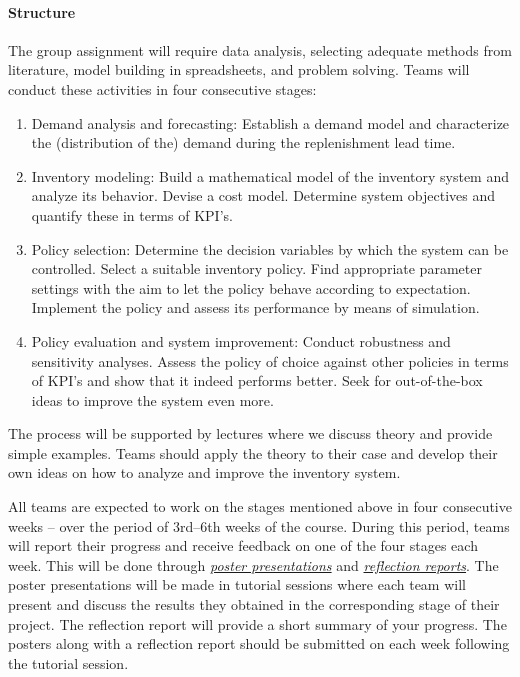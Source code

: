 \documentclass{article}
\begin{document}
\paragraph{Structure} The group assignment will require data analysis, selecting adequate methods from literature, model building in spreadsheets, and problem solving. Teams will conduct these activities in four consecutive stages: 
\begin{enumerate}[leftmargin=*,label=Stage \arabic*:]
\item Demand analysis and forecasting: Establish a demand model and characterize the (distribution of the) demand during the replenishment lead time.
\item Inventory modeling: Build a mathematical model of the inventory system and analyze its behavior. Devise a cost model. Determine system objectives and quantify these in terms of KPI's.
\item Policy selection: Determine the decision variables by which the system can be controlled. Select a suitable inventory policy. Find appropriate parameter settings with the aim  to let the policy behave according to expectation. Implement the policy and assess its performance by means of simulation.
\item Policy evaluation and system improvement: Conduct robustness and sensitivity analyses. Assess the policy of choice against other policies in terms of KPI's and show that it indeed performs better. Seek for out-of-the-box ideas to improve the system even more.
\end{enumerate}

The process will be supported by lectures where we discuss theory and provide simple examples. Teams should apply the theory to their case and develop their own ideas on how to analyze and improve the inventory system.

All teams are expected to work on the stages mentioned above in four consecutive weeks -- over the period of 3rd--6th weeks of the course. During this period, teams will report their progress and receive feedback on one of the four stages each week. This will be done through \hyperref[par:presentation]{\textit{poster presentations}} and \hyperref[par:reflection]{\textit{reflection reports}}. The poster presentations will be made in tutorial sessions where each team will present and discuss the results they obtained in the corresponding stage of their project. The reflection report will provide a short summary of your progress. The posters along with a reflection report should be submitted on \nestor each week following the tutorial session. 
\end{document}
